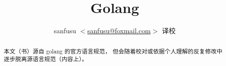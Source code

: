 \documentclass[UTF8,SlantFont]{ctexrep}
\begin{document}
\begin{titlepage}
\title{Golang}
\author{sanfusu $<$\href{mailto:sanfusu@foxmail.com}{sanfusu@foxmail.com}$>$ 译校}
\maketitle
\begin{abstract}
	本文（书）源自 golang 的官方语言规范，
	但会随着校对或依据个人理解的反复修改中逐步脱离源语言规范（内容上）。
\end{abstract}
\end{titlepage}



















\end{document}
